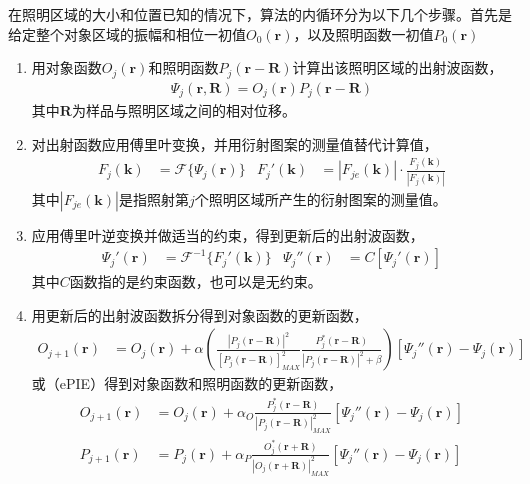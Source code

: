 \documentclass[10pt,aspectratio=169]{beamer} %
\renewcommand{\vec}[1]{\boldsymbol{#1}} %
\begin{document}
\begin{frame}[allowframebreaks]
    在照明区域的大小和位置已知的情况下，算法的内循环分为以下几个步骤。首先是给定整个对象区域的振幅和相位一初值$O_0(\vec{r})$，以及照明函数一初值$P_0(\vec{r})$
    \begin{enumerate}
        \item 用对象函数$O_j(\vec{r})$和照明函数$P_j(\vec{r}-\vec{R})$计算出该照明区域的出射波函数，
              \begin{align}
                  \Psi _j(\vec{r},\vec{R})=O_j(\vec{r})P_j(\vec{r}-\vec{R}) \label{0}
              \end{align}
              其中$\vec{R}$为样品与照明区域之间的相对位移。
        \item 对出射函数应用傅里叶变换，并用衍射图案的测量值替代计算值，
              \begin{align*}
                  F_j(\vec{k}) & =\mathcal{F}\{\Psi _j(\vec{r})\} & F_j'(\vec{k}) & =|F_{je}(\vec{k})|\cdot \frac{F_j(\vec{k})}{|F_j(\vec{k})|}
              \end{align*}
              其中$|F_{je}(\vec{k})|$是指照射第$j$个照明区域所产生的衍射图案的测量值。
        \item 应用傅里叶逆变换并做适当的约束，得到更新后的出射波函数，
              \begin{align*}
                  \Psi _{j}'(\vec{r}) & =\mathcal{F}^{-1}\{F_j'(\vec{k})\} & \Psi _{j}''(\vec{r}) & =C[\Psi _{j}'(\vec{r})]
              \end{align*}
              其中$C$函数指的是约束函数，也可以是无约束。
        \item 用更新后的出射波函数拆分得到对象函数的更新函数，
              \begin{align}
                  O_{j+1}(\vec{r}) & =O_{j}(\vec{r})+\alpha \left(\frac{|P_j(\vec{r}-\vec{R})|^2}{[P_j(\vec{r}-\vec{R})]_{MAX}^2} \frac{P_j^*(\vec{r}-\vec{R})}{|P_j(\vec{r}-\vec{R})|^2+\beta}\right)[\Psi _{j}''(\vec{r})-\Psi _{j}(\vec{r})] \label{1}
              \end{align}
              或（ePIE）得到对象函数和照明函数的更新函数，
              \begin{align*}
                  O_{j+1}(\vec{r}) & =O_{j}(\vec{r})+\alpha_O \frac{P_j^*(\vec{r}-\vec{R})}{|P_j(\vec{r}-\vec{R})|_{MAX}^2}[\Psi _{j}''(\vec{r})-\Psi _{j}(\vec{r})] \\
                  P_{j+1}(\vec{r}) & =P_{j}(\vec{r})+\alpha_P \frac{O_j^*(\vec{r}+\vec{R})}{|O_j(\vec{r}+\vec{R})|_{MAX}^2}[\Psi _{j}''(\vec{r})-\Psi _{j}(\vec{r})]
              \end{align*}
    \end{enumerate}
\end{frame}
\end{document}
